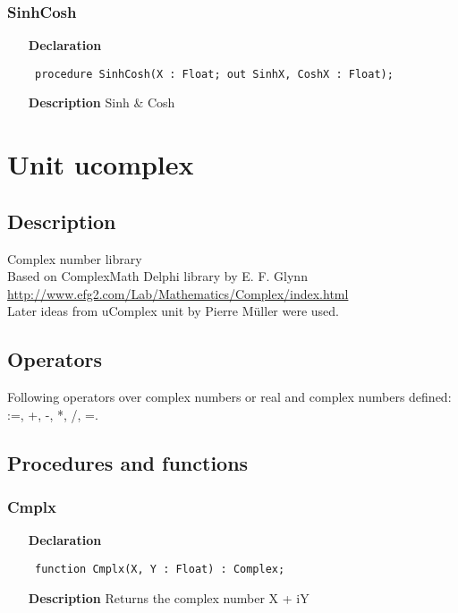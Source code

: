 \documentclass[12pt,a4paper,oneside]{report}
\newcommand{\lmath}[1]{   %
	\marginpar{\vspace{#1} 
		\begin{flushright}
			LMath
	\end{flushright} }
}
\newcommand{\declarationitem}[1]{\textbf{#1}}
\newcommand{\descriptiontitle}[1]{\textbf{#1}}
\newcommand{\code}[1]{\texttt{#1}}
\begin{document}
\subsubsection{SinhCosh}
\label{uhyper-SinhCosh}
\begin{itemize}\item[\declarationitem{Declaration}\hfill]
	\begin{flushleft}
		\code{
			procedure SinhCosh(X : Float; out SinhX, CoshX : Float);}
		
	\end{flushleft}
	
	\par
	\item[\descriptiontitle{Description}]
	Sinh {\&} Cosh
	
\end{itemize}


\section{Unit ucomplex}
\label{ucomplex}
\subsection{Description}
Complex number library \\
Based on ComplexMath Delphi library by E. F. Glynn\\ \href{http://www.efg2.com/Lab/Mathematics/Complex/index.html}{http://www.efg2.com/Lab/Mathematics/Complex/index.html} \\Later ideas from uComplex unit by Pierre M\"uller were used. 
\subsection{Operators} \lmath{-24pt}
Following operators over complex numbers or real and complex numbers defined: :=, +, -, *, /, =.
\subsection{Procedures and functions}
\subsubsection{Cmplx}
\label{ucomplex-Cmplx}
\begin{itemize}\item[\declarationitem{Declaration}\hfill]
\begin{flushleft}
\code{
function Cmplx(X, Y : Float) : Complex;}
\end{flushleft}
\item[\descriptiontitle{Description}]
Returns the complex number X + iY
\end{itemize}
\end{document}
